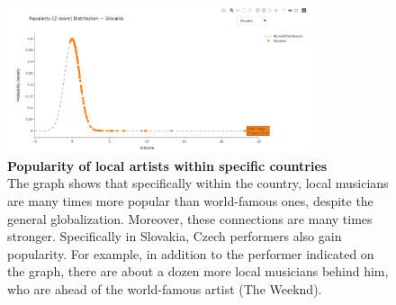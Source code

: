 \documentclass{article}
\begin{document}
\clearpage

\begin{figure}[htbp]
    \centering
    \includegraphics[width=0.8\textwidth]{data/report_figures/graph4_spotify.png}
    \caption{\textbf{Popularity of local artists within specific countries} \\
    The graph shows that specifically within the country, local musicians are many times more popular than world-famous ones, despite the general globalization. Moreover, these connections are many times stronger. Specifically in Slovakia, Czech performers also gain popularity. For example, in addition to the performer indicated on the graph, there are about a dozen more local musicians behind him, who are ahead of the world-famous artist (The Weeknd).}
    \label{fig:itunes1}
\end{figure}
\end{document}
